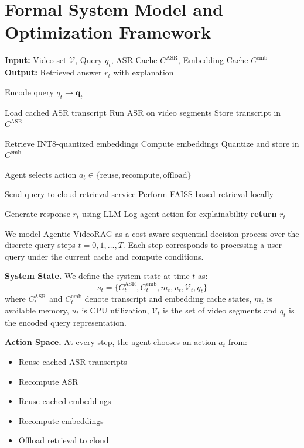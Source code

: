 \documentclass[conference,twocolumn]{IEEEtran}
\begin{document}
\section{Formal System Model and Optimization Framework}

\begin{algorithm}[htbp]
\caption{Agentic-VideoRAG Query Processing}
\label{alg:agentic_videorag}
\begin{algorithmic}[1]
\STATE \textbf{Input:} Video set $\mathcal{V}$, Query $q_t$, ASR Cache $C^{\text{ASR}}$, Embedding Cache $C^{\text{emb}}$
\STATE \textbf{Output:} Retrieved answer $r_t$ with explanation

\STATE Encode query $q_t \rightarrow \mathbf{q}_t$

\STATE Load cached ASR transcript
\ELSE
\STATE Run ASR on video segments
\STATE Store transcript in $C^{\text{ASR}}$
\ENDIF

\STATE Retrieve INT8-quantized embeddings
\ELSE
\STATE Compute embeddings
\STATE Quantize and store in $C^{\text{emb}}$
\ENDIF

\STATE Agent selects action $a_t \in \{\text{reuse}, \text{recompute}, \text{offload}\}$

\STATE Send query to cloud retrieval service
\ELSE
\STATE Perform FAISS-based retrieval locally
\ENDIF

\STATE Generate response $r_t$ using LLM
\STATE Log agent action for explainability
\STATE \textbf{return} $r_t$
\end{algorithmic}
\end{algorithm}

We model Agentic-VideoRAG as a cost-aware sequential decision process over the discrete query steps $t = 0,1,\dots,T$. Each step corresponds to processing a user query under the current cache and compute conditions.

\textbf{System State.} We define the system state at time $t$ as:
\[
s_t = \{ C^{\text{ASR}}_t, C^{\text{emb}}_t, m_t, u_t, \mathcal{V}_t, q_t \}
\]
where $C^{\text{ASR}}_t$ and $C^{\text{emb}}_t$ denote transcript and embedding cache states, $m_t$ is available memory, $u_t$ is CPU utilization, $\mathcal{V}_t$ is the set of video segments and $q_t$ is the encoded query representation.

\textbf{Action Space.} At every step, the agent chooses an action $a_t$ from:
\begin{itemize}
\item Reuse cached ASR transcripts
\item Recompute ASR
\item Reuse cached embeddings
\item Recompute embeddings
\item Offload retrieval to cloud
\end{itemize}
\end{document}
